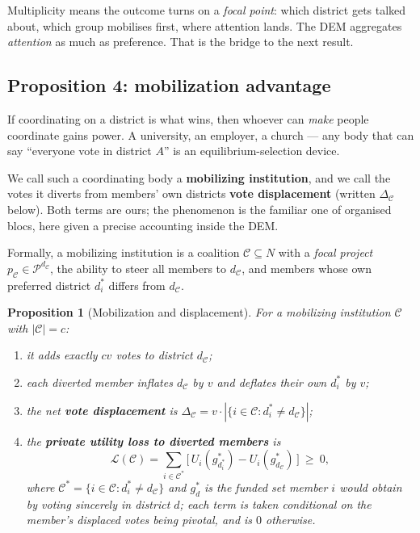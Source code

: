 \documentclass[11pt,letterpaper]{article}
\theoremstyle{definition}
\theoremstyle{plain}
\newtheorem{proposition}{Proposition}[section]
\theoremstyle{remark}
\newcommand{\Pset}{\mathcal{P}}
\newcommand{\agents}{N}
\newcommand{\votes}{v}
\begin{document}
\begin{keyidea}
Multiplicity means the outcome turns on a \emph{focal point}: which district gets talked about,
which group mobilises first, where attention lands. The DEM aggregates \emph{attention} as much as
preference. That is the bridge to the next result.
\end{keyidea}

\subsection{Proposition 4: mobilization advantage}

If coordinating on a district is what wins, then whoever can \emph{make} people coordinate gains
power. A university, an employer, a church --- any body that can say ``everyone vote in district
$A$'' is an equilibrium-selection device.

\begin{naming}
We call such a coordinating body a \textbf{mobilizing institution}, and we call the votes it
diverts from members' own districts \textbf{vote displacement} (written $\Delta_\mathcal{C}$ below).
Both terms are ours; the phenomenon is the familiar one of organised blocs, here given a precise
accounting inside the DEM.
\end{naming}

\noindent Formally, a mobilizing institution is a coalition $\mathcal{C}\subseteq\agents$ with a
\emph{focal project} $p_\mathcal{C}\in\Pset^{d_\mathcal{C}}$, the ability to steer all members to
$d_\mathcal{C}$, and members whose own preferred district $d_i^*$ differs from $d_\mathcal{C}$.

\begin{proposition}[Mobilization and displacement]
\label{prop:mob}
For a mobilizing institution $\mathcal{C}$ with $|\mathcal{C}|=c$:
\begin{enumerate}[label=\textup{(\roman*)},nosep]
  \item it adds exactly $c\votes$ votes to district $d_\mathcal{C}$;
  \item each diverted member inflates $d_\mathcal{C}$ by $\votes$ and deflates their own $d_i^*$ by
        $\votes$;
  \item the net \textbf{vote displacement} is
        $\Delta_\mathcal{C}=\votes\cdot|\{i\in\mathcal{C}:d_i^*\ne d_\mathcal{C}\}|$;
  \item the \textbf{private utility loss to diverted members} is
        \[
          \mathcal{L}(\mathcal{C})=\sum_{i\in\mathcal{C}^*}\bigl[\,U_i(g^*_{d_i^*})-U_i(g^*_{d_\mathcal{C}})\,\bigr]\ \ge\ 0,
        \]
        where $\mathcal{C}^*=\{i\in\mathcal{C}:d_i^*\ne d_\mathcal{C}\}$ and $g^*_d$ is the funded
        set member $i$ would obtain by voting sincerely in district $d$; each term is taken
        conditional on the member's displaced votes being pivotal, and is $0$ otherwise.
\end{enumerate}
\end{proposition}
\end{document}
